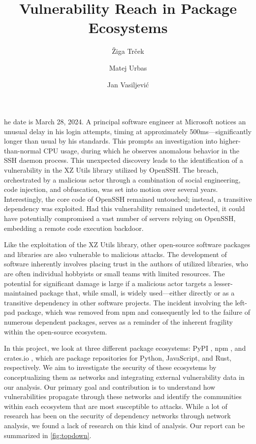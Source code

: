 \documentclass[9pt,twocolumn,twoside]{pnas-report}
\title{Vulnerability Reach in Package Ecosystems}
\author[a]{Žiga Trček}
\author[a]{Matej Urbas}
\author[a]{Jan Vasiljević}
\affil[a]{University of Ljubljana, Faculty of Computer and Information Science, Ve\v{c}na pot 113, SI-1000 Ljubljana, Slovenia}
\begin{document}
\maketitle
\thispagestyle{firststyle}

he date is March 28, 2024. A principal software engineer at Microsoft notices an unusual delay in his login attempts, timing at approximately 500ms—significantly longer than usual by his standards.
This prompts an investigation into higher-than-normal CPU usage, during which he observes anomalous behavior in the SSH daemon process.
This unexpected discovery leads to the identification of a vulnerability in the XZ Utils library utilized by OpenSSH.
The breach, orchestrated by a malicious actor through a combination of social engineering, code injection, and obfuscation, was set into motion over several years.
Interestingly, the core code of OpenSSH remained untouched; instead, a transitive dependency was exploited.
Had this vulnerability remained undetected, it could have potentially compromised a vast number of servers relying on OpenSSH, embedding a remote code execution backdoor.


Like the exploitation of the XZ Utils library, other open-source software packages and libraries are also vulnerable to malicious attacks.
The development of software inherently involves placing trust in the authors of utilized libraries, who are often individual hobbyists or small teams with limited resources.
The potential for significant damage is large if a malicious actor targets a lesser-maintained package that, while small, is widely used—either directly or as a transitive dependency in other software projects.
The incident involving the left-pad package, which was removed from npm and consequently led to the failure of numerous dependent packages, serves as a reminder of the inherent fragility within the open-source ecosystem.

In this project, we look at three different package ecosystems: PyPI \cite{pypi}, npm \cite{NPM}, and crates.io \cite{crates}, which are package repositories for Python, JavaScript, and Rust, respectively.
We aim to investigate the security of these ecosystems by conceptualizing them as networks and integrating external vulnerability data in our analysis.
Our primary goal and contribution is to understand how vulnerabilities propagate through these networks and identify the communities within each ecosystem that are most susceptible to attacks.
While a lot of research has been on the security of dependency networks through network analysis,
we found a lack of research on this kind of analysis.
Our report can be summarized in \ref{fig:topdown}.
\end{document}
